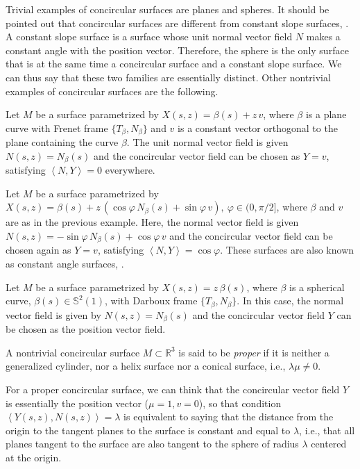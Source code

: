 \documentclass[eqnumis, pdf]{hjms}
\def\R#1{\ensuremath{\mathbb{R}^{#1}}}
\def\S#1{\ensuremath{\mathbb{S}^{#1}}}
\def\<{\left<}
\def\>{\right>}
\begin{document}
Trivial examples of concircular surfaces are planes and spheres.
It should be pointed out that concircular surfaces are different from constant slope surfaces, \cite{Mun10}. A constant slope surface is a surface whose unit normal vector field $N$ makes a constant angle with the position vector. Therefore, the sphere is the only surface that is at the same time a concircular surface and a constant slope surface. We can thus say that these two families are essentially distinct.
Other nontrivial examples of concircular surfaces are the following.

\begin{example}\label{ex-gc}
Let $M$ be a surface parametrized by
$X(s,z)=\beta(s)+z\,v$,
where $\beta$ is a plane curve with Frenet frame $\{T_\beta,N_\beta\}$ and $v$ is a constant vector orthogonal to the plane containing the curve $\beta$. The unit normal vector field is given $N(s,z)=N_\beta(s)$ and the concircular vector field can be chosen as $Y=v$, satisfying $\<N,Y\>=0$ everywhere.
\end{example}

\begin{example}\label{ex-hs}
Let $M$ be a surface parametrized by
$X(s,z)=\beta(s)+z\,(\cos\varphi\,N_\beta(s)+\sin\varphi\,v),\ \varphi\in (0,\pi/2]$,
where $\beta$ and $v$ are as in the previous example. Here, the normal vector field is given $N(s,z)=-\sin\varphi\,N_\beta(s)+\cos\varphi\,v$ and the concircular vector field can be chosen again as $Y=v$, satisfying $\<N,Y\>=\cos\varphi$. These surfaces are also known as constant angle surfaces, \cite{DSRH09}.
\end{example}

\begin{example}\label{ex-cs}
Let $M$ be a surface parametrized by
$X(s,z)=z\,\beta(s)$,
where $\beta$ is a spherical curve, $\beta(s)\in\S{2}(1)$, with Darboux frame $\{T_\beta,N_\beta\}$. In this case, the normal vector field is given by $N(s,z)=N_\beta(s)$ and the concircular vector field $Y$ can be chosen as the position vector field.
\end{example}

A nontrivial concircular surface $M\subset\R{3}$ is said to be \emph{proper} if it is neither a generalized cylinder, nor a helix surface nor a conical surface, i.e., $\lambda\mu\neq0$.

For a proper concircular surface, we can think that the concircular vector field $Y$ is essentially the position vector ($\mu=1, v=0$), so that condition $\<Y(s,z),N(s,z)\>=\lambda$ is equivalent to saying that the distance from the origin to the tangent planes to the surface is constant and equal to $\lambda$, i.e., that all planes tangent to the surface are also tangent to the sphere of radius $\lambda$ centered at the origin.
\end{document}
